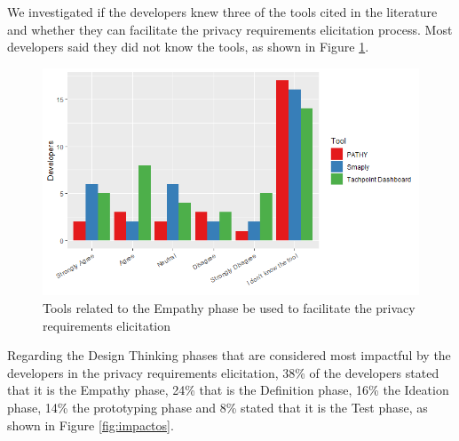 \documentclass[conference]{IEEEtran}
\begin{document}

We investigated if the developers knew three of the tools cited in the literature and whether they can facilitate the privacy requirements elicitation process. Most developers said they did not know the tools, as shown in Figure \ref{fig:tool}.

\begin{figure}
    \centering
    \includegraphics[width=5.5in]{Figures/RQ18.png}
    \caption{Tools related to the Empathy phase be used to facilitate the privacy requirements elicitation}
    \label{fig:tool}
\end{figure}


Regarding the Design Thinking phases that are considered most impactful by the developers in the privacy requirements elicitation, 38\% of the developers stated that it is the Empathy phase, 24\% that is the Definition phase, 16\% the Ideation phase, 14\% the prototyping phase and 8\% stated that it is the Test phase, as shown in Figure \ref{fig:impactos}. %
\end{document}

